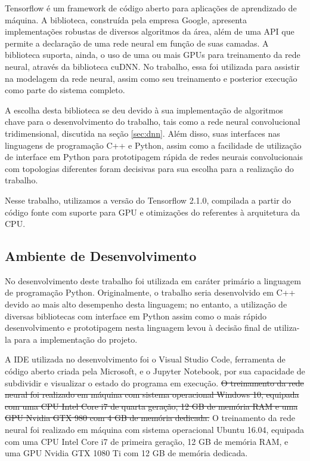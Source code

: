 Tensorflow\cite{tensorflow2015-whitepaper} é um framework de código aberto para aplicações de aprendizado de máquina.
A biblioteca, construída pela empresa Google, apresenta implementações robustas de diversos algoritmos da área, além de uma API que permite a declaração de uma rede neural em função de suas camadas.
A biblioteca suporta, ainda, o uso de uma ou mais GPUs para treinamento da rede neural, através da biblioteca cuDNN. No trabalho, essa foi utilizada para assistir na modelagem da rede neural, assim como seu treinamento e posterior execução como parte do sistema completo.

A escolha desta biblioteca se deu devido à sua implementação de algoritmos chave para o desenvolvimento do trabalho, tais como a rede neural convolucional tridimensional, discutida na seção \ref{sec:dnn}.
Além disso, suas interfaces nas linguagens de programação C++ e Python, assim como a facilidade de utilização de interface em Python para prototipagem rápida de redes neurais convolucionais com topologias diferentes foram decisivas para sua escolha para a realização do trabalho.

Nesse trabalho, utilizamos a versão do Tensorflow 2.1.0, compilada a partir do código fonte com suporte para GPU e otimizações do referentes à arquitetura da CPU.

\subsection{Ambiente de Desenvolvimento}
\label{subsec:environ}

No desenvolvimento deste trabalho foi utilizada em caráter primário a linguagem de programação Python.
Originalmente, o trabalho seria desenvolvido em C++ devido ao mais alto desempenho desta linguagem; no entanto, a utilização de diversas bibliotecas com interface em Python assim como o mais rápido desenvolvimento e prototipagem nesta linguagem levou à decisão final de utiliza-la para a implementação do projeto.

A IDE utilizada no desenvolvimento foi o Visual Studio Code, ferramenta de código aberto criada pela Microsoft, e o Jupyter Notebook\cite{kluyverJupyterNotebooksPublishing2016}, por sua capacidade de subdividir e visualizar o estado do programa em execução.
\sout{O treinamento da rede neural foi realizado em máquina com sistema operacional Windows 10, equipada com uma CPU Intel Core i7 de quarta geração, 12 GB de memória RAM e uma GPU Nvidia GTX 980 com 4 GB de memória dedicada.}
O treinamento da rede neural foi realizado em máquina com sistema operacional Ubuntu 16.04, equipada com uma CPU Intel Core i7 de primeira geração, 12 GB de memória RAM, e uma GPU Nvidia GTX 1080 Ti com 12 GB de memória dedicada.

